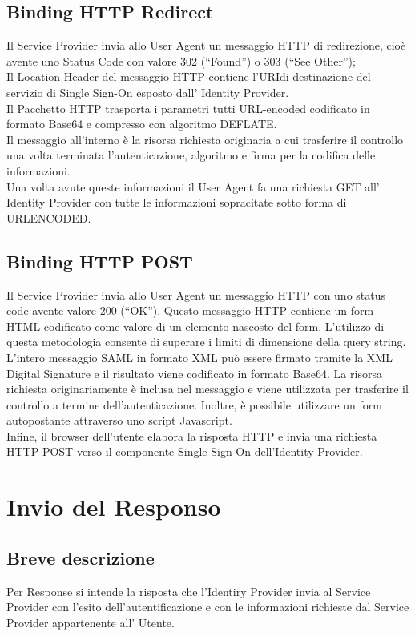 \subsection{Binding HTTP Redirect}
Il Service Provider invia allo User Agent un messaggio HTTP di redirezione, cioè avente uno Status Code con
valore 302 (“Found”) o 303 (“See Other”);
\\ Il Location Header del messaggio HTTP contiene l’URI\glo di destinazione del servizio di Single
Sign-On esposto dall’ Identity Provider.
\\ Il Pacchetto HTTP trasporta i parametri tutti URL-encoded codificato in formato
Base64 e compresso con algoritmo DEFLATE.
\\ Il messaggio all'interno è la risorsa richiesta originaria a cui 
trasferire il controllo una volta terminata l'autenticazione, 
algoritmo e firma per la codifica delle informazioni.
\\ Una volta avute queste informazioni il User Agent fa una 
richiesta GET all' Identity Provider con tutte le informazioni 
sopracitate sotto forma di URLENCODED.

\subsection{Binding HTTP POST}
Il Service Provider invia allo User Agent un messaggio HTTP con uno status code avente valore 200 (“OK”). 
Questo messaggio HTTP contiene un form HTML codificato come valore di un elemento nascosto del form. 
L'utilizzo di questa metodologia consente di superare i limiti di dimensione della query string. \\
L’intero messaggio SAML in formato XML può essere firmato tramite la XML Digital Signature e il risultato viene codificato 
in formato Base64. La risorsa richiesta originariamente è inclusa nel messaggio e viene utilizzata per trasferire il controllo 
a termine dell'autenticazione. Inoltre, è possibile utilizzare un form autopostante attraverso uno script Javascript. \\
Infine, il browser dell’utente elabora la risposta HTTP e invia una richiesta HTTP POST verso il componente Single Sign-On 
dell’Identity Provider.

\section{Invio del Responso}
\subsection{Breve descrizione}
Per Response si intende la risposta che l'Identiry Provider invia al Service Provider con 
l'esito dell'autentificazione e con le informazioni richieste dal Service Provider appartenente all' Utente.
